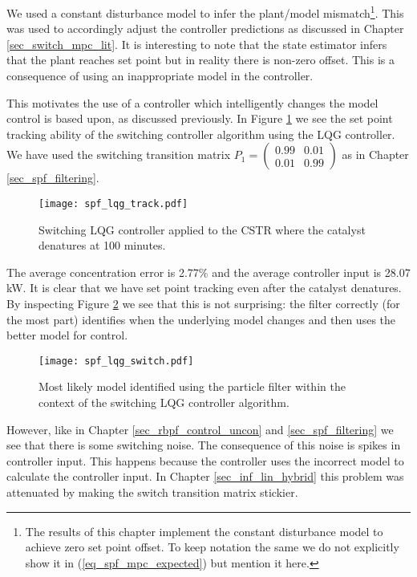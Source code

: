 We used a constant disturbance model to infer the plant/model mismatch\footnote{The results of this chapter implement the constant disturbance model to achieve zero set point offset. To keep notation the same we do not explicitly show it in (\ref{eq_spf_mpc_expected}) but mention it here.}. This was used to accordingly adjust the controller predictions as discussed in Chapter \ref{sec_switch_mpc_lit}. It is interesting to note that the state estimator infers that the plant reaches set point but in reality there is non-zero offset. This is a consequence of using an inappropriate model in the controller. 

This motivates the use of a controller which intelligently changes the model control is based upon, as discussed previously. In Figure \ref{fig_spf_lqg_track} we see the set point tracking ability of the switching controller algorithm using the LQG controller. We have used the switching transition matrix $P_1=\begin{pmatrix}
0.99 & 0.01 \\ 0.01 & 0.99
\end{pmatrix}$ as in Chapter \ref{sec_spf_filtering}.
\begin{figure}[H] 
\centering
\texttt{[image: spf\_lqg\_track.pdf]}
\caption{Switching LQG controller applied to the CSTR where the catalyst denatures at 100 minutes.}
\label{fig_spf_lqg_track}
\end{figure}
The average concentration error is 2.77\% and the average controller input is 28.07 kW. It is clear that we have set point tracking even after the catalyst denatures. By inspecting Figure \ref{fig_spf_lqg_switch} we see that this is not surprising: the filter correctly (for the most part) identifies when the underlying model changes and then uses the better model for control. 
\begin{figure}[H] 
\centering
\texttt{[image: spf\_lqg\_switch.pdf]}
\caption{Most likely model identified using the particle filter within the context of the switching LQG controller algorithm.}
\label{fig_spf_lqg_switch}
\end{figure}
However, like in Chapter \ref{sec_rbpf_control_uncon} and \ref{sec_spf_filtering} we see that there is some switching noise. The consequence of this noise is spikes in controller input. This happens because the controller uses the incorrect model to calculate the controller input. In Chapter \ref{sec_inf_lin_hybrid} this problem was attenuated by making the switch transition matrix stickier. 

